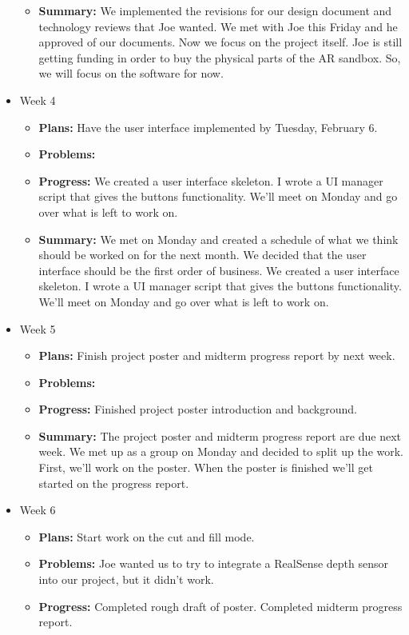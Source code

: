 \documentclass[onecolumn, draftclsnofoot,10pt, compsoc]{IEEEtran}
\begin{document}
\begin{itemize}
\begin{itemize}
    \item \textbf{Summary:} We implemented the revisions for our design document and technology reviews that Joe wanted. We met with Joe this Friday and he approved of our documents. Now we focus on the project itself. Joe is still getting funding in order to buy the physical parts of the AR sandbox. So, we will focus on the software for now.
	\end{itemize}
\item Week 4
	\begin{itemize}
	\item \textbf{Plans:} Have the user interface implemented by Tuesday, February 6.
    \item \textbf{Problems:} 
    \item \textbf{Progress:} We created a user interface skeleton. I wrote a UI manager script that gives the buttons functionality. We'll meet on Monday and go over what is left to work on.
    \item \textbf{Summary:} We met on Monday and created a schedule of what we think should be worked on for the next month. We decided that the user interface should be the first order of business. We created a user interface skeleton. I wrote a UI manager script that gives the buttons functionality. We'll meet on Monday and go over what is left to work on.
	\end{itemize}
\item Week 5
	\begin{itemize}
	\item \textbf{Plans:} Finish project poster and midterm progress report by next week.
    \item \textbf{Problems:} 
    \item \textbf{Progress:} Finished project poster introduction and background.
    \item \textbf{Summary:}  The project poster and midterm progress report are due next week. We met up as a group on Monday and decided to split up the work. First, we'll work on the poster. When the poster is finished we'll get started on the progress report.
	\end{itemize}
\item Week 6
	\begin{itemize}
	\item \textbf{Plans:} Start work on the cut and fill mode.
    \item \textbf{Problems:} Joe wanted us to try to integrate a RealSense depth sensor into our project, but it didn't work.
    \item \textbf{Progress:} Completed rough draft of poster. Completed midterm progress report.

\end{itemize}
\end{itemize}
\end{document}
